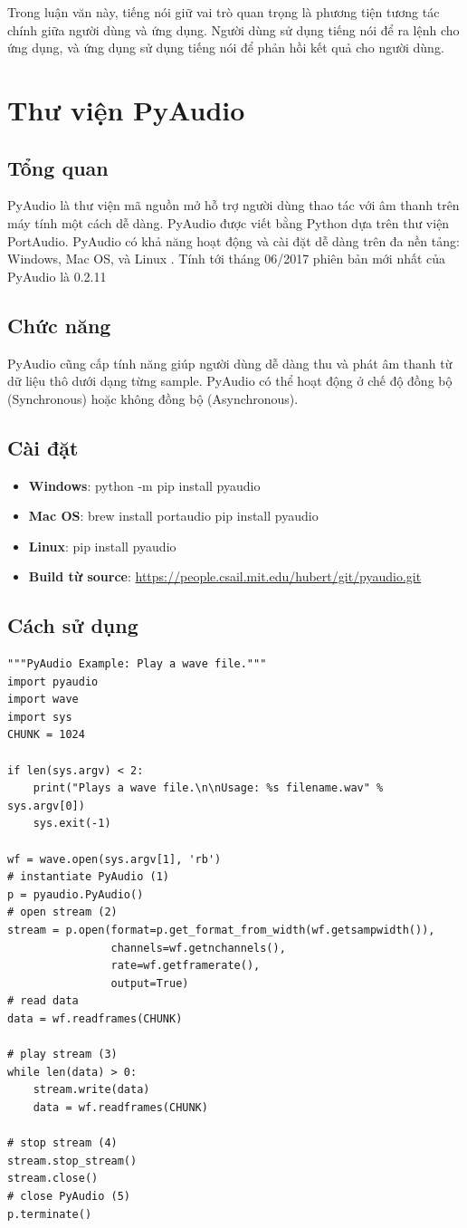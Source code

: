 Trong luận văn này, tiếng nói giữ vai trò quan trọng là phương tiện tương tác chính giữa người dùng và ứng dụng. Người dùng sử dụng tiếng nói để ra lệnh cho ứng dụng, và ứng dụng sử dụng tiếng nói để phản hồi kết quả cho người dùng.

\section{Thư viện PyAudio}
\subsection{Tổng quan}
PyAudio là thư viện mã nguồn mở hỗ trợ người dùng thao tác với âm thanh trên máy tính một cách dễ dàng. PyAudio được viết bằng Python dựa trên thư viện PortAudio. PyAudio có khả năng hoạt động và cài đặt dễ dàng trên đa nền tảng: Windows, Mac OS, và Linux . Tính tới tháng 06/2017 phiên bản mới nhất của PyAudio là 0.2.11

\subsection{Chức năng}
PyAudio cũng cấp tính năng giúp người dùng dễ dàng thu và phát âm thanh từ dữ liệu thô dưới dạng từng sample. PyAudio có thể hoạt động ở chế độ đồng bộ (Synchronous) hoặc không đồng bộ (Asynchronous).

\subsection{Cài đặt}
\begin{itemize}
	\item \textbf{Windows}: python -m pip install pyaudio
	\item \textbf{Mac OS}: brew install portaudio 
pip install pyaudio
	\item \textbf{Linux}: pip install pyaudio
	\item \textbf{Build từ source}: \url{https://people.csail.mit.edu/hubert/git/pyaudio.git}
\end{itemize}

\subsection{Cách sử dụng}
\begin{lstlisting}
"""PyAudio Example: Play a wave file."""
import pyaudio
import wave
import sys
CHUNK = 1024

if len(sys.argv) < 2:
	print("Plays a wave file.\n\nUsage: %s filename.wav" % sys.argv[0])
	sys.exit(-1)

wf = wave.open(sys.argv[1], 'rb')
# instantiate PyAudio (1)
p = pyaudio.PyAudio()
# open stream (2)
stream = p.open(format=p.get_format_from_width(wf.getsampwidth()),
                channels=wf.getnchannels(),
                rate=wf.getframerate(),
                output=True)
# read data
data = wf.readframes(CHUNK)

# play stream (3)
while len(data) > 0:
	stream.write(data)
	data = wf.readframes(CHUNK)

# stop stream (4)
stream.stop_stream()
stream.close()
# close PyAudio (5)
p.terminate()
\end{lstlisting}

